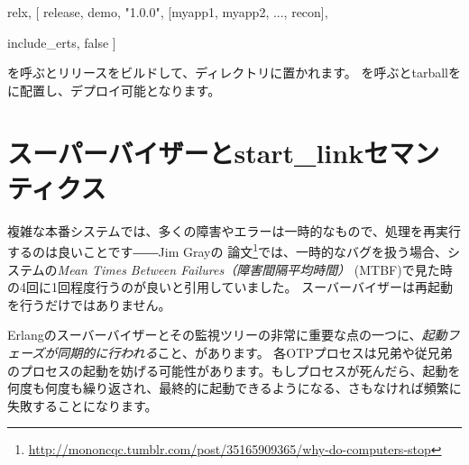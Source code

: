 \begin{VerbatimText}
{relx, [
  {release, {demo, "1.0.0"},
    [myapp1, myapp2, ..., recon]},
     
  {include_erts, false} %
]}
\end{VerbatimText}

を呼ぶとリリースをビルドして、ディレクトリに置かれます。
を呼ぶとtarballをに配置し、デプロイ可能となります。

\section{スーパーバイザーとstart\_linkセマンティクス}
\label{sec:supervisors-and-start-link-semantics}

複雑な本番システムでは、多くの障害やエラーは一時的なもので、処理を再実行するのは良いことです――Jim Grayの
論文\footnote{\href{http://mononcqc.tumblr.com/post/35165909365/why-do-computers-stop}{http://mononcqc.tumblr.com/post/35165909365/why-do-computers-stop}}では、一時的なバグを扱う場合、システムの\emph{Mean Times Between Failures（障害間隔平均時間）} (MTBF)で見た時の4回に1回程度行うのが良いと引用していました。
スーバーバイザーは再起動を行うだけではありません。

Erlangのスーバーバイザーとその監視ツリーの非常に重要な点の一つに、\emph{起動フェーズが同期的に行われる}こと、があります。
各OTPプロセスは兄弟や従兄弟のプロセスの起動を妨げる可能性があります。もしプロセスが死んだら、起動を何度も何度も繰り返され、最終的に起動できるようになる、さもなければ頻繁に失敗することになります。

